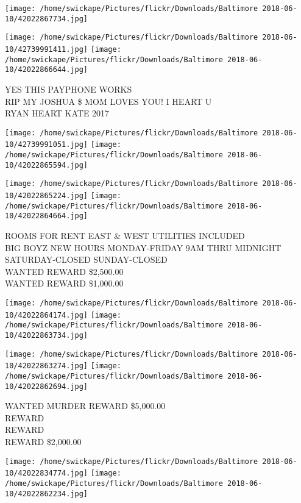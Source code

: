 \documentclass[10pt,letterpaper]{article}
\begin{document}
\texttt{[image: /home/swickape/Pictures/flickr/Downloads/Baltimore 2018-06-10/42022867734.jpg]}

\vspace{0.25in}
\texttt{[image: /home/swickape/Pictures/flickr/Downloads/Baltimore 2018-06-10/42739991411.jpg]}
\texttt{[image: /home/swickape/Pictures/flickr/Downloads/Baltimore 2018-06-10/42022866644.jpg]}

YES THIS PAYPHONE WORKS\\
RIP MY JOSHUA \$ MOM LOVES YOU!  I HEART U\\
RYAN HEART KATE 2017
\pagebreak

\texttt{[image: /home/swickape/Pictures/flickr/Downloads/Baltimore 2018-06-10/42739991051.jpg]}
\texttt{[image: /home/swickape/Pictures/flickr/Downloads/Baltimore 2018-06-10/42022865594.jpg]}

\texttt{[image: /home/swickape/Pictures/flickr/Downloads/Baltimore 2018-06-10/42022865224.jpg]}
\texttt{[image: /home/swickape/Pictures/flickr/Downloads/Baltimore 2018-06-10/42022864664.jpg]}

ROOMS FOR RENT EAST \& WEST UTILITIES INCLUDED\\
BIG BOYZ NEW HOURS MONDAY{-}FRIDAY 9AM THRU MIDNIGHT SATURDAY{-}CLOSED SUNDAY{-}CLOSED\\
WANTED REWARD \$2,500.00\\
WANTED REWARD \$1,000.00
\pagebreak

\texttt{[image: /home/swickape/Pictures/flickr/Downloads/Baltimore 2018-06-10/42022864174.jpg]}
\texttt{[image: /home/swickape/Pictures/flickr/Downloads/Baltimore 2018-06-10/42022863734.jpg]}

\texttt{[image: /home/swickape/Pictures/flickr/Downloads/Baltimore 2018-06-10/42022863274.jpg]}
\texttt{[image: /home/swickape/Pictures/flickr/Downloads/Baltimore 2018-06-10/42022862694.jpg]}

WANTED MURDER REWARD \$5,000.00\\
REWARD\\
REWARD\\
REWARD \$2,000.00
\pagebreak

\texttt{[image: /home/swickape/Pictures/flickr/Downloads/Baltimore 2018-06-10/42022834774.jpg]}
\texttt{[image: /home/swickape/Pictures/flickr/Downloads/Baltimore 2018-06-10/42022862234.jpg]}
\end{document}
